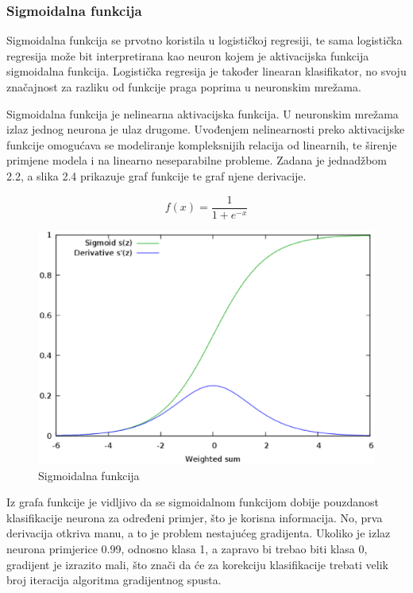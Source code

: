 \documentclass[times, utf8, diplomski]{fer}
\begin{document}
\subsubsection{Sigmoidalna funkcija}
Sigmoidalna funkcija se prvotno koristila u logističkoj regresiji, te sama logistička regresija može bit interpretirana kao neuron kojem je aktivacijska funkcija sigmoidalna funkcija. Logistička regresija je također linearan klasifikator, no svoju značajnost za razliku od funkcije praga poprima u neuronskim mrežama. \par

Sigmoidalna funkcija je nelinearna aktivacijska funkcija. U neuronskim mrežama izlaz jednog neurona je ulaz drugome. Uvođenjem nelinearnosti preko aktivacijske funkcije omogućava se modeliranje kompleksnijih relacija od linearnih, te širenje primjene modela i na linearno neseparabilne probleme. Zadana je jednadžbom 2.2, a slika 2.4 prikazuje graf funkcije te graf njene derivacije. \par

\begin{equation}
    f(x)=\frac{1}{1 + e^{-x}}
\end{equation}

\begin{figure}[htbp]
    \centering
    \includegraphics[scale=0.3]{Slike/sigmoid}
    \caption{Sigmoidalna funkcija \cite{sigmoid}}
\end{figure}

Iz grafa funkcije je vidljivo da se sigmoidalnom funkcijom dobije pouzdanost klasifikacije neurona za određeni primjer, što je korisna informacija. No, prva derivacija otkriva manu, a to je problem nestajućeg gradijenta. Ukoliko je izlaz neurona primjerice 0.99, odnosno klasa 1, a zapravo bi trebao biti klasa 0, gradijent je izrazito mali, što znači da će za korekciju klasifikacije trebati velik broj iteracija algoritma gradijentnog spusta.
\end{document}

